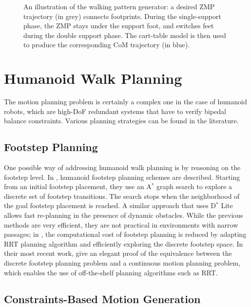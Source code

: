 \begin{figure}
  \centering
  
  \caption[ZMP preview-control pattern generator.]{An illustration of
    the walking pattern generator: a desired ZMP trajectory (in grey)
    connects footprints. During the single-support phase, the ZMP
    stays under the support foot, and switches feet during the double
    support phase. The cart-table model is then used to produce the
    corresponding CoM trajectory (in blue).}
  \label{fig:chap1-zmp}
\end{figure}

\section{Humanoid Walk Planning}
\label{sec:chap1-humanoid-walk-planning}

The motion planning problem is certainly a complex one in the case of
humanoid robots, which are high-DoF redundant systems that have to
verify bipedal balance constraints. Various planning strategies can
be found in the literature.

\subsection{Footstep Planning}
\label{subsec:chap1-footstep-planning}

One possible way of addressing humanoid walk planning is by reasoning
on the footstep level. In \cite{kuff01,ches05}, humanoid footstep
planning schemes are described. Starting from an initial footstep
placement, they use an A$^{*}$ graph search \cite{hart68} to explore a
discrete set of footstep transitions. The search stops when the
neighborhood of the goal footstep placement is reached. A similar
approach \cite{garimort2011humanoid} that uses D$^*$ Lite allows fast
re-planning in the presence of dynamic obstacles. While the previous
methods are very efficient, they are not practical in environments
with narrow passages; in \cite{xia09, perr11a}, the computational cost
of footstep planning is reduced by adapting RRT planning algorithm and
efficiently exploring the discrete footstep space. In their most
recent work, \cite{perr11b, perr12} give an elegant proof of the
equivalence between the discrete footstep planning problem and a
continuous motion planning problem, which enables the use of
off-the-shelf planning algorithms such as RRT.

\subsection{Constraints-Based Motion Generation}
\label{subsec:chap1-constraints-motion-generation}

